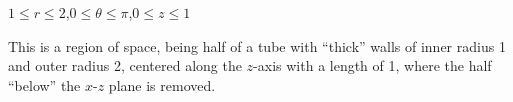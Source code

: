 {$1\leq r\leq 2$,\quad $0\leq \theta\leq \pi$,\quad $0\leq z\leq 1$
}
{\begin{enumerate}
This is a region of space, being half of a tube with ``thick'' walls of inner radius 1 and outer radius 2, centered along the $z$-axis with a length of 1, where the half ``below'' the $x$-$z$ plane is removed. 
\end{enumerate}
}
